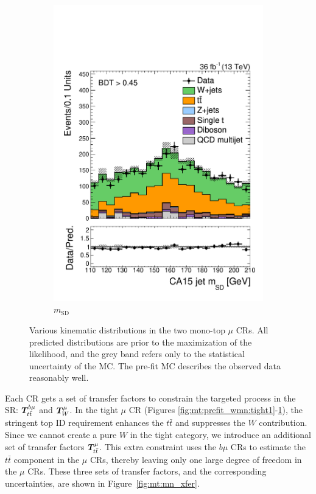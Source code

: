 \begin{figure}[]
\begin{center}
\begin{subfigure}[t]{0.32\textwidth}
            \includegraphics[width=\textwidth]{figures/monotop/prefit/singlemuonw_tight_fj1MSD.pdf}
            \caption{$m_\mathrm{SD}$}
            \label{fig:mt:prefit_wmn:tight2}
        \end{subfigure}
        \caption{Various kinematic distributions in the two mono-top $\mu$ CRs. 
                 All predicted distributions are prior to the maximization of the likelihood, and the grey band refers only to the statistical uncertainty of the MC.
                 The pre-fit MC describes the observed data reasonably well.
        }
        \label{fig:mt:prefit_wmn}
    \end{center}
\end{figure}

Each CR gets a set of transfer factors to constrain the targeted process in the SR: $\bm{T}^{b\mu}_{t\bar{t}}$ and $\bm{T}^{\mu}_{W}$.
In the tight $\mu$ CR (Figures \ref{fig:mt:prefit_wmn:tight1}-\ref{fig:mt:prefit_wmn:tight2}), the stringent top ID requirement enhances the $t\bar{t}$ and suppresses the $W$ contribution.
Since we cannot create a pure $W$ in the tight category, we introduce an additional set of transfer factors $\bm{T}^{\mu}_{t\bar{t}}$.
This extra constraint uses the $b\mu$ CRs to estimate the $t\bar{t}$ component in the $\mu$ CRs, thereby leaving only one large degree of freedom in the $\mu$ CRs.
These three sets of transfer factors, and the corresponding uncertainties, are shown in Figure~\ref{fig:mt:mn_xfer}.


